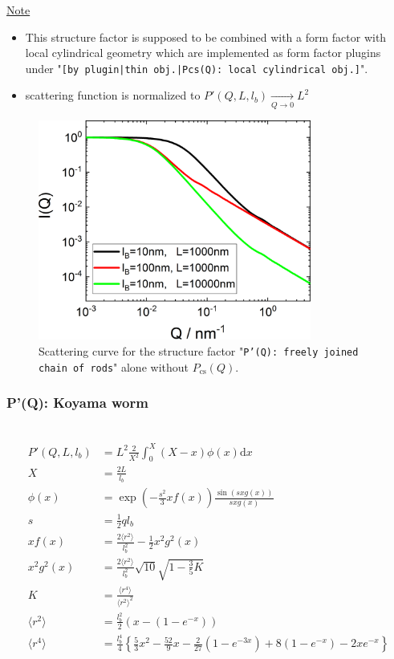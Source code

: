 \noindent
\uline{Note}
\begin{itemize}
  \item This structure factor is supposed to be combined with a form factor with local cylindrical geometry which are implemented as form factor plugins
under "\texttt{[by plugin|thin obj.|Pcs(Q): local cylindrical obj.]}".
  \item scattering function is normalized to $P'(Q,L,l_b) \xrightarrow[Q\rightarrow 0]{} L^2$
\end{itemize}

\begin{figure}[htb]
\begin{center}
\includegraphics[width=0.8\textwidth]{../images/form_factor/polymer_semiflexible/PprimeFreelyJoinedRods.png}
\end{center}
\caption{Scattering curve for the structure factor "\texttt{P'(Q): freely joined chain of rods}" alone without $P_\mathrm{cs}(Q)$.}
\label{fig_IQ:PprimeFreelyJoinedChainOfRods}
\end{figure}

\clearpage
\subsubsection{P'(Q): Koyama worm} ~\\
\label{plugin:Pprime4koyama}
\cite{Koyama1973,Koyama1974,Poetschke2000}
\begin{align}
P'(Q,L,l_b) &= L^2\frac{2}{X^2}\int_0^X (X-x)\phi(x)\mathrm{d}x \\
X &= \frac{2L}{l_b} \label{eq:PprimeKoyama}\\
\phi(x) &= \exp\left(-\frac{s^2}{3}xf(x)\right) \frac{\sin(sxg(x))}{sxg(x)} \\
s &= \frac12 ql_b \\
xf(x) &= \frac{2\langle r^2\rangle}{l_b^2} - \frac12 x^2g^2(x) \\
x^2g^2(x) &= \frac{2\langle r^2\rangle}{l_b^2} \sqrt{10}\sqrt{1-\frac35 K} \\
K &= \frac{\langle r^4\rangle}{\langle r^2\rangle^2} \\
\langle r^2\rangle &= \frac{l_b^2}{2} \left(x-\left(1-e^{-x}\right)\right)\\
\langle r^4\rangle &= \frac{l_b^4}{4} \left\{\frac53 x^2 -\frac{52}{9}x-\frac{2}{27}\left(1-e^{-3x}\right)+8\left(1-e^{-x}\right)-2xe^{-x}\right\}
\end{align}

